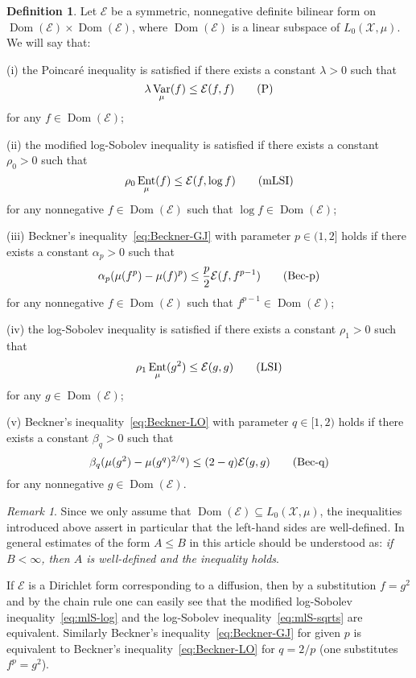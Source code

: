 \documentclass[a4paper]{amsart}
\theoremstyle{definition}
\newtheorem{definition}[theorem]{Definition}
\theoremstyle{remark}
\newtheorem{remark}[theorem]{Remark}
\numberwithin{equation}{section}
\newcommand{\calX}{\mathcal{X}}
\DeclareMathOperator{\Dom}{Dom} %
\newcommand*{\calE}{\mathcal{E}}
\DeclareMathOperator{\Ent}{Ent}	%
\DeclareMathOperator{\Var}{Var}	%
\begin{document}
\begin{definition}\label{defi:inequalities} Let $\calE$ be a symmetric, nonnegative definite bilinear form on $\Dom(\calE)\times \Dom(\calE)$, where $\Dom(\calE)$ is a linear subspace of $L_0(\calX,\mu)$.
We will say that:

 (i) the Poincar\'{e} inequality is satisfied if there exists a constant $\lambda>0$ such that
\begin{equation}
\label{eq:Poinc}
	\lambda\Var_\mu(f) \le \calE(f,f)
	\tag{\text{P}}
\end{equation}
for any $f\in \Dom(\calE)$;

 (ii)  the  modified log-Sobolev inequality is satisfied if there exists a constant $\rho_0>0$ such that
\begin{equation}
 \label{eq:mlS-log}
 \rho_0 \Ent_\mu(f)\leq \calE(f,\log f)
 \tag{\text{mLSI}}
\end{equation}
for any  nonnegative $f\in \Dom(\calE)$ such that $\log f\in \Dom(\calE)$;

 (iii)  Beckner's inequality~\eqref{eq:Beckner-GJ} with parameter $p\in(1,2]$ holds if there exists a constant $\alpha_p>0$ such that
\begin{equation}
 \label{eq:Beckner-GJ}
 \alpha_p( \mu(f^p) - \mu(f)^p) \leq \frac{p}{2} \calE(f,f^{p-1})
 \tag{\text{Bec-p}}
\end{equation}
for any nonnegative $f\in \Dom(\calE)$ such that $f^{p-1}\in \Dom(\calE)$; %

  (iv) the log-Sobolev inequality is satisfied if there exists a constant $\rho_1>0$ such that
\begin{equation}
 \label{eq:mlS-sqrts}
 \rho_1 \Ent_\mu(g^2)\leq \calE(g,g)
 \tag{\text{LSI}}
\end{equation}
for any $g \in \Dom(\calE)$;

(v)  Beckner's inequality~\eqref{eq:Beckner-LO} with parameter $q\in[1,2)$ holds if there exists a constant $\beta_q>0$ such that
\begin{equation}
 \label{eq:Beckner-LO}
 \beta_q (\mu(g^2) - \mu(g^q)^{2/q}) \leq (2-q) \calE(g,g)
 \tag{\text{Bec-q}}
\end{equation}
for any nonnegative $g\in \Dom(\calE)$.
\end{definition}

\begin{remark} Since we only assume that $\Dom(\calE) \subseteq L_0(\calX,\mu)$, the inequalities introduced above assert in particular that the left-hand sides are well-defined. In general estimates of the form $A \le B$ in this article should be understood as: \emph{if $B < \infty$, then $A$ is well-defined and the inequality holds}.
\end{remark}
If $\calE$ is a Dirichlet form corresponding to a diffusion, then by a substitution $f = g^2$ and by the chain rule one can easily see that the modified log-Sobolev inequality~\eqref{eq:mlS-log} and the log-Sobolev inequality~\eqref{eq:mlS-sqrts} are equivalent. Similarly Beckner's inequality~\eqref{eq:Beckner-GJ} for given $p$ is equivalent to Beckner's inequality~\eqref{eq:Beckner-LO} for $q=2/p$ (one substitutes $f^p=g^2$).
\end{document}

